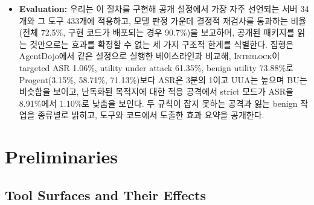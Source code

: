 \documentclass[acmsmall,screen,review,anonymous]{acmart}
\begin{document}
\begin{itemize}
    \item \textbf{Evaluation:} 우리는 이 절차를 구현해 공개 설정에서 가장 자주 선언되는 서버 34개와 그 도구 433개에 적용하고, 모델 판정 가운데 결정적 재검사를 통과하는 비율(전체 72.5\%, 구현 코드가 배포되는 경우 90.7\%)을 보고하며, 공개된 패키지를 읽는 것만으로는 효과를 확정할 수 없는 세 가지 구조적 한계를 식별한다. 집행은 AgentDojo에서 같은 설정으로 실행한 베이스라인과 비교해, \textsc{Interlock}이 targeted ASR 1.06\%, utility under attack 61.35\%, benign utility 73.88\%로 Progent(3.15\%, 58.71\%, 71.13\%)보다 ASR은 3분의 1이고 UUA는 높으며 BU는 비슷함을 보이고, 난독화된 목적지에 대한 적응 공격에서 strict 모드가 ASR을 8.91\%에서 1.10\%로 낮춤을 보인다. 두 규칙이 잡지 못하는 공격과 잃는 benign 작업을 종류별로 밝히고, 도구와 코드에서 도출한 효과 요약을 공개한다.
\end{itemize}



\section{Preliminaries}
\label{sec:prelim}

\subsection{Tool Surfaces and Their Effects}
\label{sec:prelim:surface}
\end{document}
